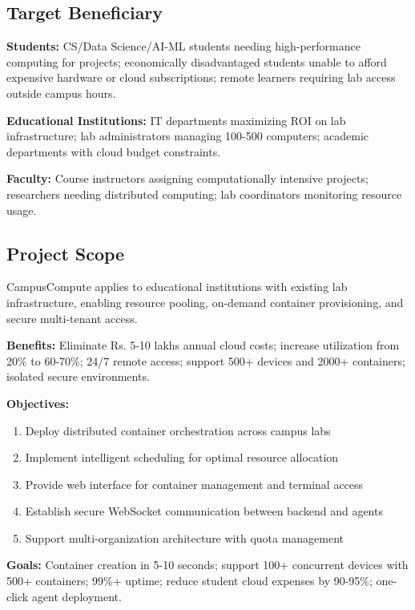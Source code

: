 \documentclass[12pt,a4paper]{article}
\begin{document}
\subsection{Target Beneficiary}

\textbf{Students:} CS/Data Science/AI-ML students needing high-performance computing for projects; economically disadvantaged students unable to afford expensive hardware or cloud subscriptions; remote learners requiring lab access outside campus hours.

\textbf{Educational Institutions:} IT departments maximizing ROI on lab infrastructure; lab administrators managing 100-500 computers; academic departments with cloud budget constraints.

\textbf{Faculty:} Course instructors assigning computationally intensive projects; researchers needing distributed computing; lab coordinators monitoring resource usage.

\subsection{Project Scope}

CampusCompute applies to educational institutions with existing lab infrastructure, enabling resource pooling, on-demand container provisioning, and secure multi-tenant access.

\textbf{Benefits:} Eliminate Rs. 5-10 lakhs annual cloud costs; increase utilization from 20\% to 60-70\%; 24/7 remote access; support 500+ devices and 2000+ containers; isolated secure environments.

\textbf{Objectives:}
\begin{enumerate}[noitemsep]
    \item Deploy distributed container orchestration across campus labs
    \item Implement intelligent scheduling for optimal resource allocation
    \item Provide web interface for container management and terminal access
    \item Establish secure WebSocket communication between backend and agents
    \item Support multi-organization architecture with quota management
\end{enumerate}

\textbf{Goals:} Container creation in 5-10 seconds; support 100+ concurrent devices with 500+ containers; 99\%+ uptime; reduce student cloud expenses by 90-95\%; one-click agent deployment.
\end{document}
